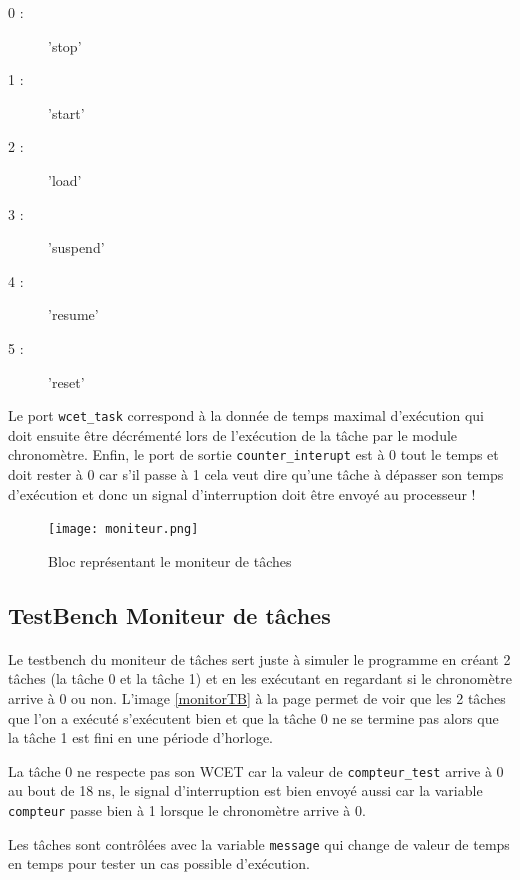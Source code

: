 \documentclass[a4paper,12pt]{report}
\begin{document}
			
			\begin{description}
				\item[0 : ] 'stop'
				\item[1 : ] 'start'
				\item[2 : ] 'load'
				\item[3 : ] 'suspend'
				\item[4 : ] 'resume'
				\item[5 : ] 'reset'
			\end{description}
			
			Le port \texttt{wcet\_task} correspond à la donnée de temps maximal d'exécution qui doit ensuite être décrémenté lors de l'exécution de la tâche par le module chronomètre.
			Enfin, le port de sortie \texttt{counter\_interupt} est à 0 tout le temps et doit rester à 0 car s'il passe à 1 cela veut dire qu'une tâche à dépasser son temps d'exécution et donc un signal d'interruption doit être envoyé au processeur !
			
			\begin{figure}[H]
				\centering
					\texttt{[image: moniteur.png]}
					\caption{Bloc représentant le moniteur de tâches}
				\label{moniteur}
			\end{figure}
	
		\subsection{TestBench Moniteur de tâches}
			\paragraph*{}
			Le testbench du moniteur de tâches sert juste à simuler le programme en créant 2 tâches (la tâche 0 et la tâche 1) et en les exécutant en regardant si le chronomètre arrive à 0 ou non. L'image \ref{monitorTB} à la page \pageref{monitorTB} permet de voir que les 2 tâches que l'on a exécuté s'exécutent bien et que la tâche 0 ne se termine pas alors que la tâche 1 est fini en une période d'horloge.
			
			La tâche 0 ne respecte pas son WCET car la valeur de \texttt{compteur\_test} arrive à 0 au bout de 18 ns, le signal d'interruption est bien envoyé aussi car la variable \texttt{compteur} passe bien à 1 lorsque le chronomètre arrive à 0.
			
			Les tâches sont contrôlées avec la variable \texttt{message} qui change de valeur de temps en temps pour tester un cas possible d'exécution.
						
\end{document}
